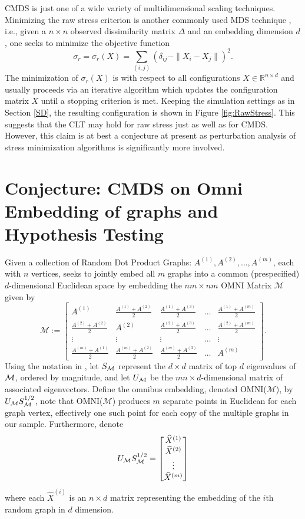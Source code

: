 CMDS is just one of a wide variety of multidimensional scaling techniques. Minimizing the raw stress criterion is another commonly used MDS technique \citep{Leeuw-Heiser}, i.e., given a $n \times n$ observed dissimilarity matrix $\Delta$ and an embedding dimension $d$, one seeks to minimize the objective function $$\sigma_r = \sigma_r(X) = \sum\limits_{(i,j)} (\delta_{ij} - \|X_i - X_j\|)^2.$$ The minimization of $\sigma_r(X)$ is with respect to all configurations $X \in \mathbb{R}^{n \times d}$ and usually proceeds via an iterative algorithm which updates the configuration matrix $X$ until a stopping criterion is met. Keeping the simulation settings as in Section \ref{SD},  the resulting configuration is shown in Figure \ref{fig:RawStress}. This suggests that the CLT may hold for raw stress just as well as for CMDS. However, this claim is at best a conjecture at present as perturbation analysis of stress minimization algorithms is significantly more involved.
\section{Conjecture: CMDS on Omni Embedding of graphs and Hypothesis Testing}
Given a collection of Random Dot Product Graphs: $A^{(1)}, A^{(2)}, \ldots, A^{(m)}$, each with $n$ vertices, \cite{OMNI} seeks to jointly embed all $m$ graphs into a common (prespecified) $d$-dimensional Euclidean space by embedding the $nm \times nm$ OMNI Matrix $\mathcal{M}$ given by
$$
\mathcal{M} :=
\begin{bmatrix}
     A^{(1)}       & \frac{A^{(1)} + A^{(2)}}{2} & \frac{A^{(1)} + A^{(3)}}{2} & \dots & \frac{A^{(1)} + A^{(m)}}{2} \\
    \frac{A^{(2)} + A^{(2)}}{2}     & A^{(2)} & \frac{A^{(2)} + A^{(3)}}{2} & \dots & \frac{A^{(2)} + A^{(m)}}{2} \\
    \vdots & \vdots & \vdots & \ldots & \vdots \\
    \frac{A^{(m)} + A^{(1)}}{2} & \frac{A^{(m)} + A^{(2)}}{2} & \frac{A^{(m)} + A^{(3)}}{2} & \dots & A^{(m)}
\end{bmatrix}.
$$
Using the notation in \cite{OMNI}, let $S_{\mathcal{M}}$ represent the $d \times d$ matrix of top $d$ eigenvalues of ${\mathcal{M}}$, ordered by magnitude, and let $U_{\mathcal{M}}$ be the $mn \times d$-dimensional matrix of associated eigenvectors. Define the omnibus embedding, denoted OMNI($\mathcal{M}$), by $U_{\mathcal{M}} S^{1/2}_{\mathcal{M}}$, note that OMNI($\mathcal{M}$) produces $m$ separate points in Euclidean for each graph vertex, effectively one such point for each copy of the multiple graphs in our sample. Furthermore, denote 
\begin{equation}
    U_{\mathcal{M}} S^{1/2}_{\mathcal{M}} =
\begin{bmatrix}
     \widehat{X}^{(1)}\\
     \widehat{X}^{(2)}\\
     \vdots \\
     \widehat{X}^{(m)}
\end{bmatrix}
\end{equation}
where each $\hat{X}^{(i)}$ is an $n \times d$ matrix representing the embedding of the $i$th random graph in $d$ dimension. 

